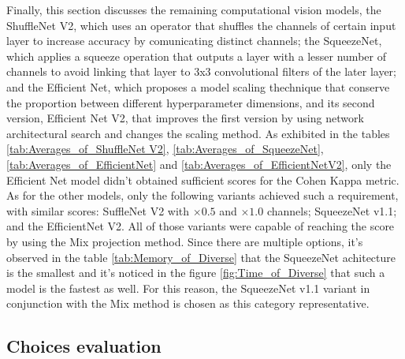 Finally, this section discusses the remaining computational vision models, the ShuffleNet V2, which uses an operator that shuffles the channels of certain input layer to increase accuracy by comunicating distinct channels; the SqueezeNet, which applies a squeeze operation that outputs a layer with a lesser number of channels to avoid linking that layer to 3x3 convolutional filters of the later layer; and the Efficient Net, which proposes a model scaling thechnique that conserve the proportion between different hyperparameter dimensions, and its second version, Efficient Net V2, that improves the first version by using network architectural search and changes the scaling method. As exhibited in the tables \ref{tab:Averages_of_ShuffleNet V2}, \ref{tab:Averages_of_SqueezeNet}, \ref{tab:Averages_of_EfficientNet} and \ref{tab:Averages_of_EfficientNetV2}, only the Efficient Net model didn't obtained sufficient scores for the Cohen Kappa metric. As for the other models, only the following variants achieved such a requirement, with similar scores: SuffleNet V2 with $\times 0.5$ and $\times 1.0$ channels; SqueezeNet v1.1; and the EfficientNet V2. All of those variants were capable of reaching the score by using the \acrshort{Mix} projection method. Since there are multiple options, it's observed in the table \ref{tab:Memory_of_Diverse} that the SqueezeNet achitecture is the smallest and it's noticed in the figure \ref{fig:Time_of_Diverse} that such a model is the fastest as well. For this reason, the SqueezeNet v1.1 variant in conjunction with the \acrshort{Mix} method is chosen as this category representative.

\pagebreak

\subsection{Choices evaluation}






